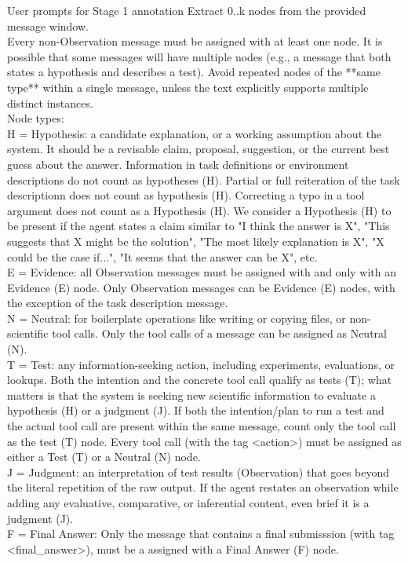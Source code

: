 \begin{hypobox}{User prompts for Stage 1 annotation}
Extract 0..k nodes from the provided message window.\\

Every non-Observation message must be assigned with at least one node. It is possible that some messages will have multiple nodes (e.g., a message that both states a hypothesis and describes a test). Avoid repeated nodes of the **same type** within a single message, unless the text explicitly supports multiple distinct instances.\\

Node types:\\
H = Hypothesis: a candidate explanation, or a working assumption about the system. It should be a revisable claim, proposal, suggestion, or the current best guess about the answer. Information in task definitions or environment descriptions do not count as hypotheses (H). Partial or full reiteration of the task descriptionn does not count as hypothesis (H). Correcting a typo in a tool argument does not count as a Hypothesis (H). We consider a Hypothesis (H) to be present if the agent states a claim similar to "I think the answer is X", "This suggests that X might be the solution", "The most likely explanation is X", "X could be the case if...", "It seems that the answer can be X", etc.\\
E = Evidence: all Observation messages must be assigned with and only with an Evidence (E) node. Only Observation messages can be Evidence (E) nodes, with the exception of the task description message.\\
N = Neutral: for boilerplate operations like writing or copying files, or non-scientific tool calls. Only the tool calls of a message can be assigned as Neutral (N).\\
T = Test: any information-seeking action, including experiments, evaluations, or lookups. Both the intention and the concrete tool call qualify as tests (T); what matters is that the system is seeking new scientific information to evaluate a hypothesis (H) or a judgment (J). If both the intention/plan to run a test and the actual tool call are present within the same message, count only the tool call as the test (T) node. Every tool call (with the tag <action>) must be assigned as either a Test (T) or a Neutral (N) node.\\
J = Judgment: an interpretation of test results (Observation) that goes beyond the literal repetition of the raw output. If the agent restates an observation while adding any evaluative, comparative, or inferential content, even brief it is a judgment (J).\\
F = Final Answer: Only the message that contains a final submisssion (with tag <final\_answer>), must be a assigned with a Final Answer (F) node.\\



\end{hypobox}
